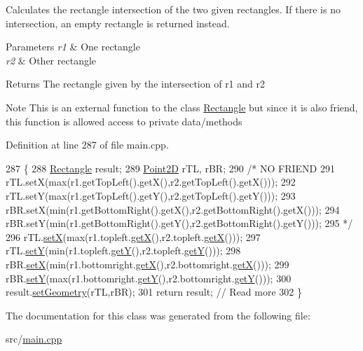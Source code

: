 Calculates the rectangle intersection of the two given rectangles. If there is no intersection, an empty rectangle is returned instead. 


\begin{DoxyParams}{Parameters}
{\em r1} & One rectangle \\
\hline
{\em r2} & Other rectangle \\
\hline
\end{DoxyParams}
\begin{DoxyReturn}{Returns}
The rectangle given by the intersection of {\ttfamily r1} and {\ttfamily r2} 
\end{DoxyReturn}
\begin{DoxyNote}{Note}
This is an external function to the class \hyperlink{classRectangle}{Rectangle} but since it is also friend, this function is allowed access to private data/methods 
\end{DoxyNote}


Definition at line 287 of file main.\+cpp.


\begin{DoxyCode}
287                                                                 \{
288     \hyperlink{classRectangle}{Rectangle} result;
289     \hyperlink{classPoint2D}{Point2D} rTL, rBR;
290     \textcolor{comment}{/* NO FRIEND}
291 \textcolor{comment}{        rTL.setX(max(r1.getTopLeft().getX(),r2.getTopLeft().getX()));}
292 \textcolor{comment}{        rTL.setY(max(r1.getTopLeft().getY(),r2.getTopLeft().getY()));}
293 \textcolor{comment}{        rBR.setX(min(r1.getBottomRight().getX(),r2.getBottomRight().getX()));}
294 \textcolor{comment}{        rBR.setY(min(r1.getBottomRight().getY(),r2.getBottomRight().getY()));}
295 \textcolor{comment}{     */}
296     rTL.\hyperlink{classPoint2D_af268842e8f2e6072ffe345dc2f322046}{setX}(max(r1.topleft.\hyperlink{classPoint2D_a6cff00d11a53dc1af436225f02bc324b}{getX}(),r2.topleft.\hyperlink{classPoint2D_a6cff00d11a53dc1af436225f02bc324b}{getX}()));
297     rTL.\hyperlink{classPoint2D_a0e08240b54e6eaae92c979082da1c91c}{setY}(min(r1.topleft.\hyperlink{classPoint2D_a1b9e163b3642485c46a1f68c54d735fc}{getY}(),r2.topleft.\hyperlink{classPoint2D_a1b9e163b3642485c46a1f68c54d735fc}{getY}()));
298     rBR.\hyperlink{classPoint2D_af268842e8f2e6072ffe345dc2f322046}{setX}(min(r1.bottomright.\hyperlink{classPoint2D_a6cff00d11a53dc1af436225f02bc324b}{getX}(),r2.bottomright.\hyperlink{classPoint2D_a6cff00d11a53dc1af436225f02bc324b}{getX}()));
299     rBR.\hyperlink{classPoint2D_a0e08240b54e6eaae92c979082da1c91c}{setY}(max(r1.bottomright.\hyperlink{classPoint2D_a1b9e163b3642485c46a1f68c54d735fc}{getY}(),r2.bottomright.\hyperlink{classPoint2D_a1b9e163b3642485c46a1f68c54d735fc}{getY}()));
300     result.\hyperlink{classRectangle_a31c4b9fc0d1ddf912f114da494e50205}{setGeometry}(rTL,rBR);
301     \textcolor{keywordflow}{return} result; \textcolor{comment}{// Read more}
302 \}
\end{DoxyCode}


The documentation for this class was generated from the following file\+:\begin{DoxyCompactItemize}
\item 
src/\hyperlink{main_8cpp}{main.\+cpp}\end{DoxyCompactItemize}
